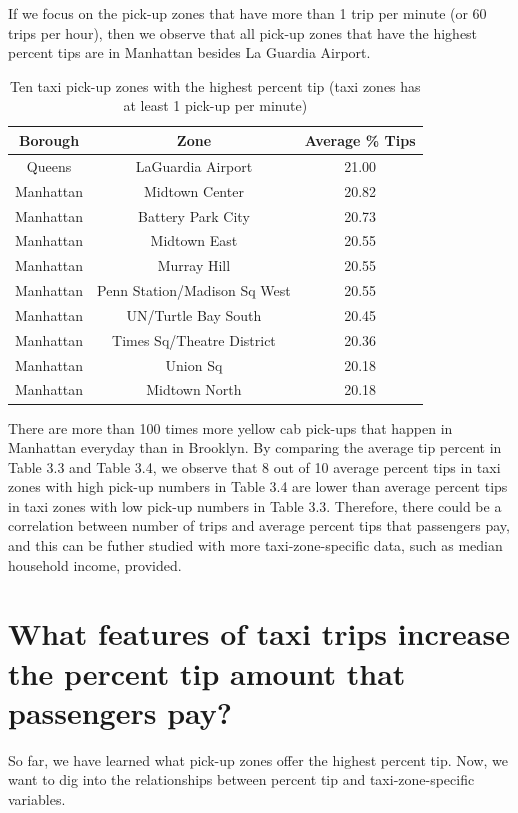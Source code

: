 \documentclass[12pt,twoside]{reedthesis}
\theoremstyle{definition}
\theoremstyle{definition}
\theoremstyle{definition}
\theoremstyle{remark}
\begin{document}
If we focus on the pick-up zones that have more than 1 trip per minute
(or 60 trips per hour), then we observe that all pick-up zones that have
the highest percent tips are in Manhattan besides La Guardia Airport.
\begin{table}

\caption{\label{tab:unnamed-chunk-46}Ten taxi pick-up zones with the highest percent tip (taxi zones has at least 1 pick-up per minute)}
\centering
\begin{tabular}[t]{ccc}
\toprule
Borough & Zone & Average \% Tips\\
\midrule
Queens & LaGuardia Airport & 21.00\\
Manhattan & Midtown Center & 20.82\\
Manhattan & Battery Park City & 20.73\\
Manhattan & Midtown East & 20.55\\
Manhattan & Murray Hill & 20.55\\
\addlinespace
Manhattan & Penn Station/Madison Sq West & 20.55\\
Manhattan & UN/Turtle Bay South & 20.45\\
Manhattan & Times Sq/Theatre District & 20.36\\
Manhattan & Union Sq & 20.18\\
Manhattan & Midtown North & 20.18\\
\bottomrule
\end{tabular}
\end{table}
There are more than 100 times more yellow cab pick-ups that happen in
Manhattan everyday than in Brooklyn. By comparing the average tip
percent in Table 3.3 and Table 3.4, we observe that 8 out of 10 average
percent tips in taxi zones with high pick-up numbers in Table 3.4 are
lower than average percent tips in taxi zones with low pick-up numbers
in Table 3.3. Therefore, there could be a correlation between number of
trips and average percent tips that passengers pay, and this can be
futher studied with more taxi-zone-specific data, such as median
household income, provided.

\section{What features of taxi trips increase the percent tip amount
that passengers
pay?}\label{what-features-of-taxi-trips-increase-the-percent-tip-amount-that-passengers-pay}

So far, we have learned what pick-up zones offer the highest percent
tip. Now, we want to dig into the relationships between percent tip and
taxi-zone-specific variables.
\end{document}
